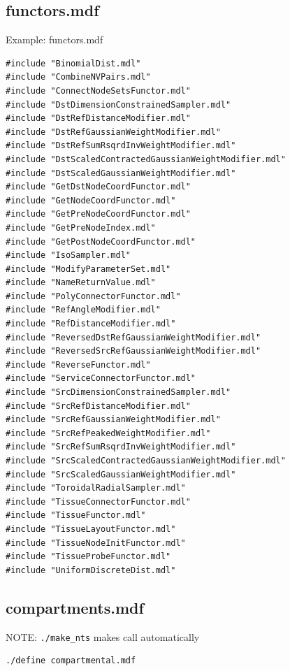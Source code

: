 \subsection{functors.mdf}
\label{sec:functors.mdf}

Example: functors.mdf
\begin{verbatim}
#include "BinomialDist.mdl"                                                                                                                                                                            
#include "CombineNVPairs.mdl"
#include "ConnectNodeSetsFunctor.mdl"
#include "DstDimensionConstrainedSampler.mdl"
#include "DstRefDistanceModifier.mdl"
#include "DstRefGaussianWeightModifier.mdl"
#include "DstRefSumRsqrdInvWeightModifier.mdl"
#include "DstScaledContractedGaussianWeightModifier.mdl"
#include "DstScaledGaussianWeightModifier.mdl"
#include "GetDstNodeCoordFunctor.mdl"
#include "GetNodeCoordFunctor.mdl"
#include "GetPreNodeCoordFunctor.mdl"
#include "GetPreNodeIndex.mdl"
#include "GetPostNodeCoordFunctor.mdl"
#include "IsoSampler.mdl"
#include "ModifyParameterSet.mdl"
#include "NameReturnValue.mdl"
#include "PolyConnectorFunctor.mdl"
#include "RefAngleModifier.mdl"
#include "RefDistanceModifier.mdl"
#include "ReversedDstRefGaussianWeightModifier.mdl"
#include "ReversedSrcRefGaussianWeightModifier.mdl" 
#include "ReverseFunctor.mdl"
#include "ServiceConnectorFunctor.mdl"
#include "SrcDimensionConstrainedSampler.mdl"
#include "SrcRefDistanceModifier.mdl"
#include "SrcRefGaussianWeightModifier.mdl"
#include "SrcRefPeakedWeightModifier.mdl"
#include "SrcRefSumRsqrdInvWeightModifier.mdl"
#include "SrcScaledContractedGaussianWeightModifier.mdl"
#include "SrcScaledGaussianWeightModifier.mdl"
#include "ToroidalRadialSampler.mdl"
#include "TissueConnectorFunctor.mdl"
#include "TissueFunctor.mdl"
#include "TissueLayoutFunctor.mdl"
#include "TissueNodeInitFunctor.mdl"
#include "TissueProbeFunctor.mdl"
#include "UniformDiscreteDist.mdl"
\end{verbatim}



\subsection{compartments.mdf}

NOTE: \verb!./make_nts! makes call automatically
\begin{verbatim}
./define compartmental.mdf
\end{verbatim}


